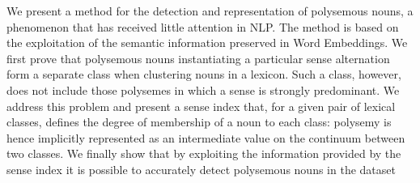 We present a method for the detection and representation of polysemous nouns, a phenomenon that has received little attention in NLP. The method is based on the exploitation of the semantic information preserved in Word Embeddings. We first prove that polysemous nouns instantiating a particular sense alternation form a separate class when clustering nouns in a lexicon. Such a class, however, does not include those polysemes in which a sense is strongly predominant. We address this problem and present a sense index that, for a given pair of lexical classes, defines the degree of membership of a noun to each class: polysemy is hence implicitly represented as an intermediate value on the continuum between two classes. We finally show that by exploiting the information provided by the sense index it is possible to accurately detect polysemous nouns in the dataset

